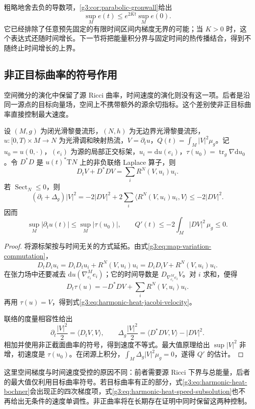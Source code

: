 粗略地舍去负的导数项，\cref{g3:cor:parabolic-gronwall}给出
\[
	\sup_M e(t)\le e^{2Kt}\sup_M e(0).
\]
它已经排除了任意预先固定的有限时间区间内梯度无界的可能；当 \(K>0\) 时，这个表达式还随时间增长。下一节将把能量积分界与固定时间的热传播结合，得到不随终止时间增长的上界。

\subsection{非正目标曲率的符号作用}
\label{g3:subsec:2603:04}
空间微分的演化中保留了源 Ricci 曲率，时间速度的演化则没有这一项。后者是沿同一源点的目标向量场，空间上不携带额外的源余切指标。这个差别使非正目标曲率直接控制最大速度。

\begin{proposition}\label{g3:prop:harmonic-heat-speed}
	设 \((M,g)\) 为闭光滑黎曼流形，\((N,h)\) 为无边界光滑黎曼流形，\(u:[0,T)\times M\to N\) 为光滑调和映射热流，\(V=\partial_tu\)，\(Q(t)=\int_M|V|^2\mu_g\)。记 \(u_0=u(0,\cdot)\)，\((e_i)\) 为源的局部正交标架，\(u_i=\mathrm du(e_i)\)，\(\tau(u_0)=\operatorname{tr}_g\nabla\mathrm du_0\)。令 \(D^*D\) 是 \(u(t)^*\mathrm TN\) 上的非负联络 Laplace 算子，则
	\begin{equation}\label{g3:eq:harmonic-heat-jacobi-velocity}
		D_tV+D^*DV=\sum_iR^N(V,u_i)u_i.
	\end{equation}
	若 \(\operatorname{Sect}_N\le0\)，则
	\begin{equation}\label{g3:eq:harmonic-heat-speed-subsolution}
		(\partial_t+\Delta_g)|V|^2
		=-2|DV|^2+2\sum_i\langle R^N(V,u_i)u_i,V\rangle
		\le-2|DV|^2.
	\end{equation}
	因而
	\[
		\sup_M|\partial_tu(t)|\le\sup_M|\tau(u_0)|,
		\qquad Q'(t)\le-2\int_M|DV|^2\,\mu_g\le0.
	\]
\end{proposition}
\begin{proof}
	将源标架按与时间无关的方式延拓。由式\eqref{g3:eq:map-variation-commutation}，
	\[
		D_tD_i u_i=D_iD_tu_i+R^N(V,u_i)u_i
		=D_iD_iV+R^N(V,u_i)u_i.
	\]
	在张力场中还要减去 \(\mathrm du(\nabla^M_{e_i}e_i)\)；它的时间导数是 \(D_{\nabla^M_{e_i}e_i}V\)。对 \(i\) 求和，便得
	\[
		D_t\tau(u)=-D^*DV+\sum_iR^N(V,u_i)u_i.
	\]
	再用 \(\tau(u)=V\)，得到式\eqref{g3:eq:harmonic-heat-jacobi-velocity}。

	联络的度量相容性给出
	\[
		\partial_t\frac{|V|^2}{2}=\langle D_tV,V\rangle,
		\qquad
		\Delta_g\frac{|V|^2}{2}=\langle D^*DV,V\rangle-|DV|^2.
	\]
	相加并使用非正截面曲率的符号，得到速度不等式。最大值原理给出 \(\sup|V|^2\) 非增，初速度是 \(\tau(u_0)\)。在闭源上积分，\(\int_M\Delta_g|V|^2\mu_g=0\)，遂得 \(Q'\) 的估计。
\end{proof}

这里空间梯度与时间速度受控的原因不同：前者需要源 Ricci 下界与总能量，后者的最大值仅利用目标曲率符号。若目标曲率有正的部分，式\eqref{g3:eq:harmonic-heat-bochner}会出现正的四次梯度项，式\eqref{g3:eq:harmonic-heat-speed-subsolution}也不再给出无条件的速度单调性。非正曲率将在长期存在证明中同时保留这两种控制。
